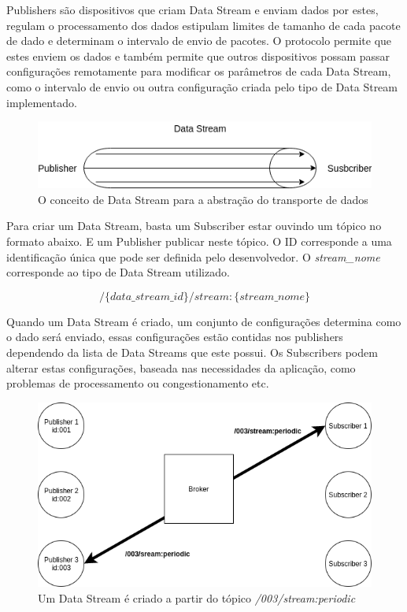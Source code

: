 Publishers são dispositivos que criam Data Stream  e enviam dados por estes, regulam o processamento dos dados estipulam limites de tamanho de cada pacote de dado e determinam o intervalo de envio de pacotes. O protocolo permite que estes enviem os dados e também permite que outros dispositivos possam passar configurações remotamente para modificar os parâmetros de cada Data Stream, como o intervalo de envio ou outra configuração criada pelo tipo de Data Stream implementado. 

\begin{figure}[h!]
\centering
\includegraphics[width=13cm]{./02_Capitulos/02_Cap3/figures/data_stream}
\caption{O conceito de Data Stream para a abstração do transporte de dados}
\label{fig:3.1.0/data_stream}
\end{figure}

Para criar um Data Stream, basta um Subscriber estar ouvindo um tópico no formato abaixo. E um Publisher publicar neste tópico. O ID corresponde a uma identificação única que pode ser definida pelo desenvolvedor. O \textit{stream\_nome} corresponde ao tipo de Data Stream utilizado.

$$ /\{data\_stream\_id\}/stream:\{stream\_nome\} $$

Quando um Data Stream é criado, um conjunto de configurações determina como o dado será enviado, essas configurações estão contidas nos publishers dependendo da lista de Data Streams que este possui. Os Subscribers podem alterar estas configurações, baseada nas necessidades da aplicação, como problemas de processamento ou congestionamento etc.

\begin{figure}[h!]
\centering
\includegraphics[width=13cm]{./02_Capitulos/02_Cap3/figures/data_stream_creation}
\caption{Um Data Stream é criado a partir do tópico \textit{/003/stream:periodic}}
\label{fig:3.1.0/data_stream_creation}
\end{figure}


